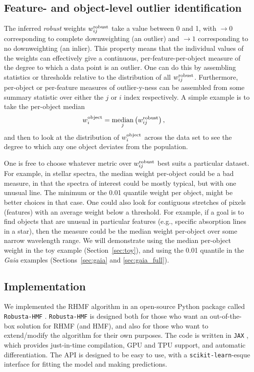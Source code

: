\documentclass[onecolumn,floatfix,linenumbers,trackchanges]{aastex631}
\begin{document}
\subsection{Feature- and object-level outlier identification} \label{sec:outlier_id}

The inferred  \emph{robust} weights $w^{\rm robust}_{ij}$ take a value between 0 and 1, with $\rightarrow0$ corresponding to complete downweighting (an outlier) and $\rightarrow1$ corresponding to no downweighting (an inlier).
This property means that the individual values of the weights can effectively give a continuous, per-feature-per-object measure of the degree to which a data point is an outlier.
One can do this by assembling statistics or thresholds relative to the distribution of all $w^{\rm robust}_{ij}$.
Furthermore, per-object or per-feature measures of outlier-y-ness can be assembled from some summary statistic over either the $j$ or $i$ index respectively.
A simple example is to take the per-object median
\begin{align}
    w^{\rm object}_i &= \operatorname*{median}_{j} \left( w_{ij}^{\rm robust} \right), \label{eq:w_spec}
\end{align}
and then to look at the distribution of $w^{\rm object}_i$ across the data set to see the degree to which any one object deviates from the population.

One is free to choose whatever metric over $w^{\rm robust}_{ij}$ best suits a particular dataset.
For example, in stellar spectra, the median weight per-object could be a bad measure, in that the spectra of interest could be mostly typical, but with one unusual line.
The minimum or the 0.01 quantile weight per object, might be better choices in that case.
One could also look for contiguous stretches of pixels (features) with an average weight below a threshold.
For example, if a goal is to find objects that are unusual in particular features (e.g., specific absorption lines in a star), then the measure could be the median weight per-object over some narrow wavelength range.
We will demonstrate using the median per-object weight in the toy example (Section~\ref{sec:toy}), and using the 0.01 quantile in the \textsl{Gaia} examples (Sections~\ref{sec:gaia} and \ref{sec:gaia_full}).

\subsection{Implementation}

We implemented the RHMF algorithm in an open-source Python package called \texttt{Robusta-HMF} \citep{hilder2026}.
\texttt{Robusta-HMF} is designed both for those who want an out-of-the-box solution for RHMF (and HMF), and also for those who want to extend/modify the algorithm for their own purposes.
The code is written in \texttt{JAX} \citep{jax2018github}, which provides just-in-time compilation, GPU and TPU support, and automatic differentiation.
The API is designed to be easy to use, with a \texttt{scikit-learn}-esque \citep{scikit-learn} interface for fitting the model and making predictions.
\end{document}
